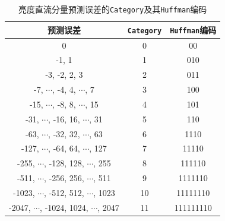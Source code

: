 \documentclass{article}
\numberwithin{figure}{section}
\numberwithin{table}{section}
\numberwithin{listing}{section}
\numberwithin{equation}{section}
\begin{document}
        \begin{table}[H]
            \caption{亮度直流分量预测误差的\texttt{Category}及其\texttt{Huffman}编码}
            \label{tab:DC_Huffman}
            \centering
        
            \begin{tabular}{ccc}
            \hline
        
            \hline
            \textbf{预测误差} & \textbf{\texttt{Category}} & \textbf{\texttt{Huffman}编码} \\
            \hline
                0 & 0 & 00 \\
                -1, 1 & 1 & 010 \\
                -3, -2, 2, 3 & 2 & 011 \\
                -7, $\cdots$, -4, 4, $\cdots$, 7 & 3 & 100 \\
                -15, $\cdots$, -8, 8, $\cdots$, 15 & 4 & 101 \\
                -31, $\cdots$, -16, 16, $\cdots$, 31 & 5 & 110 \\
                -63, $\cdots$, -32, 32, $\cdots$, 63 & 6 & 1110 \\
                -127, $\cdots$, -64, 64, $\cdots$, 127 & 7 & 11110 \\
                -255, $\cdots$, -128, 128, $\cdots$, 255 & 8 & 111110 \\
                -511, $\cdots$, -256, 256, $\cdots$, 511 & 9 & 1111110 \\
                -1023, $\cdots$, -512, 512, $\cdots$, 1023 & 10 & 11111110 \\
                -2047, $\cdots$, -1024, 1024, $\cdots$, 2047 & 11 & 111111110 \\
            \hline

            \hline
            \end{tabular}
        \end{table}
\end{document}
